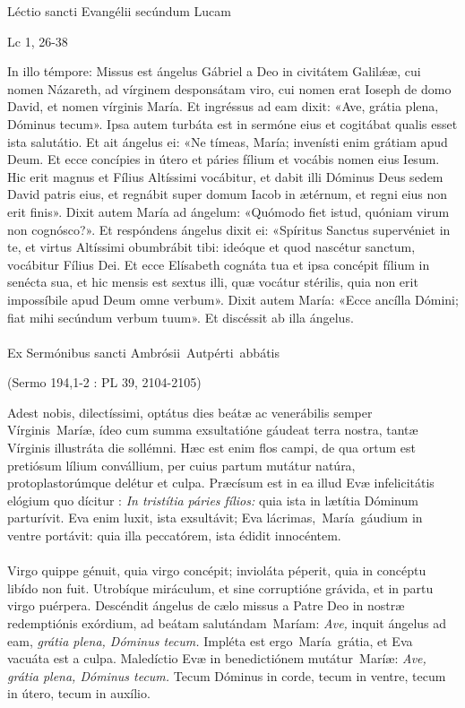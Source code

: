\documentclass[options]{article}
\begin{document}
	Léctio sancti Evangélii secúndum Lucam
	\begin{flushright}
	Lc 1, 26-38
	\end{flushright}
	In illo témpore:
	Missus est ángelus Gábriel a Deo in civitátem Galil\'{æ}æ, cui nomen Názareth, ad vírginem desponsátam viro, cui nomen erat Ioseph de domo David, et nomen vírginis María.
	Et ingréssus ad eam dixit: «Ave, grátia plena, Dóminus tecum». Ipsa autem turbáta est in sermóne eius et cogitábat qualis esset ista salutátio.
	Et ait ángelus ei: «Ne tímeas, María; invenísti enim grátiam apud Deum. Et ecce concípies in útero et páries fílium et vocábis nomen eius Iesum. Hic erit magnus et Fílius Altíssimi vocábitur, et dabit illi Dóminus Deus sedem David patris eius, et regnábit super domum Iacob in ætérnum, et regni eius non erit finis».
	Dixit autem María ad ángelum: «Quómodo fiet istud, quóniam virum non cognósco?».
	Et respóndens ángelus dixit ei: «Spíritus Sanctus supervéniet in te, et virtus Altíssimi obumbrábit tibi: ideóque et quod nascétur sanctum, vocábitur Fílius Dei. Et ecce Elísabeth cognáta tua et ipsa concépit fílium in senécta sua, et hic mensis est sextus illi, quæ vocátur stérilis, quia non erit impossíbile apud Deum omne verbum».
	Dixit autem María: «Ecce ancílla Dómini; fiat mihi secúndum verbum tuum». Et discéssit ab illa ángelus.\\
	\\
	Ex Sermónibus sancti Ambrósii Autpérti abbátis
	\begin{flushright}
			(Sermo 194,1-2 : PL 39, 2104-2105)
	\end{flushright}
	Adest nobis, dilectíssimi, optátus dies beátæ ac venerábilis semper Vírginis Maríæ, ídeo cum summa exsultatióne gáudeat terra nostra, tantæ Vírginis illustráta die sollémni. Hæc est enim flos campi, de qua ortum est pretiósum lílium convállium, per cuius partum mutátur natúra, protoplastorúmque delétur et culpa. Præcísum est in ea illud Evæ infelicitátis elógium quo dícitur : \emph{In tristítia páries fílios:} quia ista in lætítia Dóminum parturívit. Eva enim luxit, ista exsultávit; Eva lácrimas, María gáudium in ventre portávit: quia illa peccatórem, ista édidit innocéntem.\\
	\\
	Virgo quippe génuit, quia virgo concépit; invioláta péperit, quia in concéptu libído non fuit. Utrobíque miráculum, et sine corruptióne grávida, et in partu virgo puérpera. Descéndit ángelus de cælo missus a Patre Deo in nostræ redemptiónis exórdium, ad beátam salutándam Maríam: \emph{Ave,} inquit ángelus ad eam, \emph{grátia plena, Dóminus tecum.} Impléta est ergo María grátia, et Eva vacuáta est a culpa. Maledíctio Evæ in benedictiónem mutátur Maríæ: \emph{Ave, grátia plena, Dóminus tecum.} Tecum Dóminus in corde, tecum in ventre, tecum in útero, tecum in auxílio.\\
\end{document}
